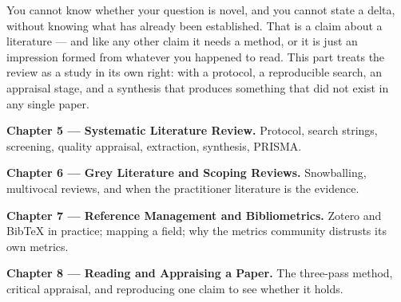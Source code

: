 
You cannot know whether your question is novel, and you cannot state a
delta, without knowing what has already been established. That is a claim about
a literature --- and like any other claim it needs a method, or it is just an
impression formed from whatever you happened to read. This part treats the
review as a study in its own right: with a protocol, a reproducible search, an
appraisal stage, and a synthesis that produces something that did not exist in
any single paper.

\begin{conceptbox}
\begin{tight}
  \item \textbf{Chapter 5 --- Systematic Literature Review.} Protocol, search strings, screening, quality appraisal, extraction, synthesis, PRISMA.
  \item \textbf{Chapter 6 --- Grey Literature and Scoping Reviews.} Snowballing, multivocal reviews, and when the practitioner literature is the evidence.
  \item \textbf{Chapter 7 --- Reference Management and Bibliometrics.} Zotero and BibTeX in practice; mapping a field; why the metrics community distrusts its own metrics.
  \item \textbf{Chapter 8 --- Reading and Appraising a Paper.} The three-pass method, critical appraisal, and reproducing one claim to see whether it holds.
\end{tight}
\end{conceptbox}
